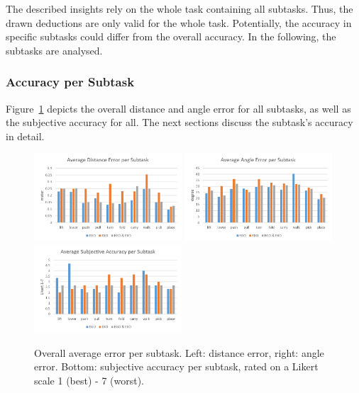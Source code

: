 The described insights rely on the whole task containing all subtasks. Thus, the drawn deductions are only valid for the whole task. Potentially, the accuracy in specific subtasks could differ from the overall accuracy. In the following, the subtasks are analysed.

\subsubsection{Accuracy per Subtask}
\label{sec:evalAccSubtask}
Figure~\ref{fig:avgErrorPerSubTask} depicts the overall distance and angle error for all subtasks, as well as the subjective accuracy for all. The next sections discuss the subtask's accuracy in detail.
\begin{figure}[H]
	\centering
	\includegraphics[width=0.49\textwidth]{figures/averageDistanceErrorPerSubTask.png}
	\includegraphics[width=0.49\textwidth]{figures/averageAngleErrorPerSubTask.png}
	\includegraphics[width=0.49\textwidth]{figures/subjectiveAccuracyBySubTask.png}
	\caption[Overall accuracy per subtask]{Overall average error per subtask. Left: distance error, right: angle error. Bottom: subjective accuracy per subtask, rated on a Likert scale 1 (best) - 7 (worst).}
	\label{fig:avgErrorPerSubTask}
\end{figure}

